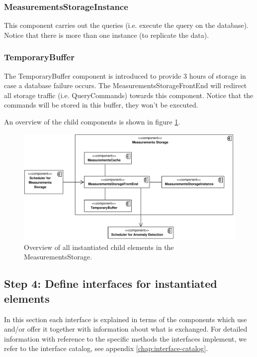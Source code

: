 \subsubsection{MeasurementsStorageInstance}

\npar This component carries out the queries (i.e. execute the query on the
database). Notice that there is more than one instance (to replicate the data).

\subsubsection{TemporaryBuffer}

\npar The TemporaryBuffer component is introduced to provide 3 hours of storage
in case a database failure occurs. The MeasurementsStorageFrontEnd will redirect
all storage traffic (i.e. QueryCommands) towards this component. Notice that the
commands will be stored in this buffer, they won't be executed.

\npar An overview of the child components is shown in figure
\ref{fig:it4/elements}.

\begin{figure}[H]
	\begin{centering}
		\includegraphics[width=\textwidth]{figs/add-it4-elements.pdf}
		\caption{Overview of all instantiated child elements in the
		MeasurementsStorage.}
		\label{fig:it4/elements}
	\end{centering}
\end{figure}

\subsection{Step 4: Define interfaces for instantiated elements}
\label{add:it4/interfaces}

\npar In this section each interface is explained in terms of the components
which use and/or offer it together with information about what is exchanged. For
detailed information with reference to the specific methods the interfaces
implement, we refer to the interface catalog, see appendix
\ref{chap:interface-catalog}.

